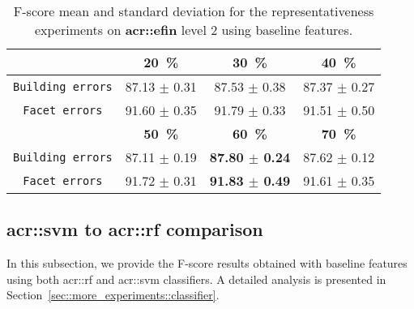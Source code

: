         \begin{table}[htbp]
            \footnotesize
            \centering
            \begin{tabular}{c c c c}
                \toprule
                & \textbf{\SI{20}{\percent}} & \textbf{\SI{30}{\percent}} & \textbf{\SI{40}{\percent}} \\
                \midrule
                \texttt{Building errors} & 87.13 $\pm$ 0.31 & 87.53 $\pm$ 0.38 & 87.37 $\pm$ 0.27 \\
                \midrule
                \texttt{Facet errors} & 91.60 $\pm$ 0.35 & 91.79 $\pm$ 0.33 & 91.51 $\pm$ 0.50 \\
                \bottomrule
                \toprule
                & \textbf{\SI{50}{\percent}} & \textbf{\SI{60}{\percent}} & \textbf{\SI{70}{\percent}} \\
                \midrule
                \texttt{Building errors} & 87.11 $\pm$ 0.19 & \textbf{87.80 $\pm$ 0.24} & 87.62 $\pm$ 0.12 \\
                \midrule
                \texttt{Facet errors} & 91.72 $\pm$ 0.31 & \textbf{91.83 $\pm$ 0.49} & 91.61 $\pm$ 0.35 \\
                \bottomrule
            \end{tabular}
            \caption{
                \label{tab::f_score_representativeness_f2}
                F-score mean and standard deviation for the representativeness experiments on \textbf{\gls{acr::efin}} level 2 using baseline features.
            }
        \end{table}
    
        \FloatBarrier
    \subsection{\texorpdfstring{\acrshort*{acr::svm}}{SVM} to \texorpdfstring{\acrshort*{acr::rf}}{RF} comparison}
        In this subsection, we provide the F-score results obtained with baseline features using both \gls{acr::rf} and \gls{acr::svm} classifiers.
        A detailed analysis is presented in Section~\ref{sec::more_experiments::classifier}.\\

